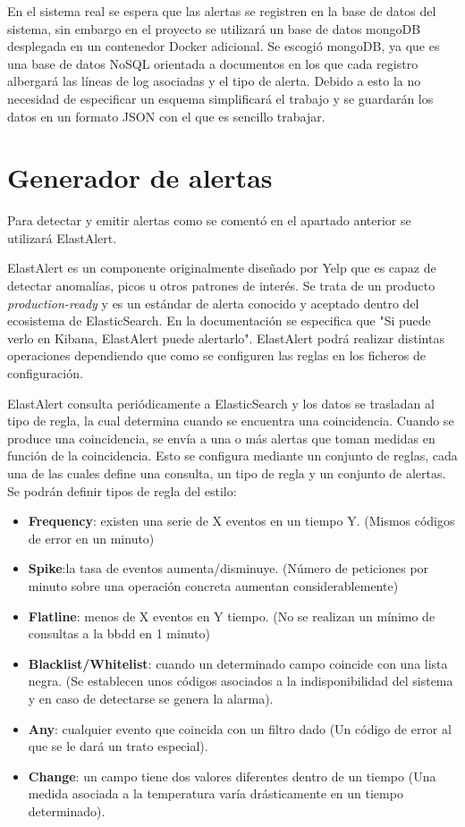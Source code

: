 En el sistema real se espera que las alertas se registren en la base de datos del sistema, sin embargo en el proyecto se utilizará un base de datos mongoDB desplegada en un contenedor Docker adicional. Se escogió mongoDB, ya que es una base de datos NoSQL orientada a documentos en los que cada registro albergará las líneas de log asociadas y el tipo de alerta. Debido a esto la no necesidad de especificar un esquema simplificará el trabajo y se guardarán los datos en un formato JSON con el que es sencillo trabajar. 

\section{Generador de alertas}

Para detectar y emitir alertas como se comentó en el apartado anterior se utilizará ElastAlert.

ElastAlert es un componente originalmente diseñado por Yelp que es capaz de detectar anomalías, picos u otros patrones de interés. Se trata de un producto \textit{production-ready} y es un estándar de alerta conocido y aceptado dentro del ecosistema de ElasticSearch. En la documentación se especifica que "Si puede verlo en Kibana, ElastAlert puede alertarlo". ElastAlert podrá realizar distintas operaciones dependiendo que como se configuren las reglas en los ficheros de configuración. 

ElastAlert consulta periódicamente a ElasticSearch y los datos se trasladan al tipo de regla, la cual determina cuando se encuentra una coincidencia. Cuando se produce una coincidencia, se envía a una o más alertas que toman medidas en función de la coincidencia. Esto se configura mediante un conjunto de reglas, cada una de las cuales define una consulta, un tipo de regla y un conjunto de alertas. Se podrán definir tipos de regla del estilo:

\begin{itemize}
\item \textbf{Frequency}: existen una serie de X eventos en un tiempo Y. (Mismos códigos de error en un minuto)
\item \textbf{Spike}:la tasa de eventos aumenta/disminuye. (Número de peticiones por minuto sobre una operación concreta aumentan considerablemente) 
\item \textbf{Flatline}: menos de X eventos en Y tiempo. (No se realizan un mínimo de consultas a la bbdd en 1 minuto)
\item \textbf{Blacklist/Whitelist}: cuando un determinado campo coincide con una lista negra. (Se establecen unos códigos asociados a la indisponibilidad del sistema y en caso de detectarse se genera la alarma).
\item \textbf{Any}: cualquier evento que coincida con un filtro dado (Un código de error al que se le dará un trato especial).
\item \textbf{Change}: un campo tiene dos valores diferentes dentro de un tiempo (Una medida asociada a la temperatura varía drásticamente en un tiempo determinado).


\end{itemize}

